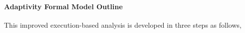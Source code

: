 \paragraph{Adaptivity Formal Model Outline}
This improved execution-based analysis is developed
 in three steps as follows,

